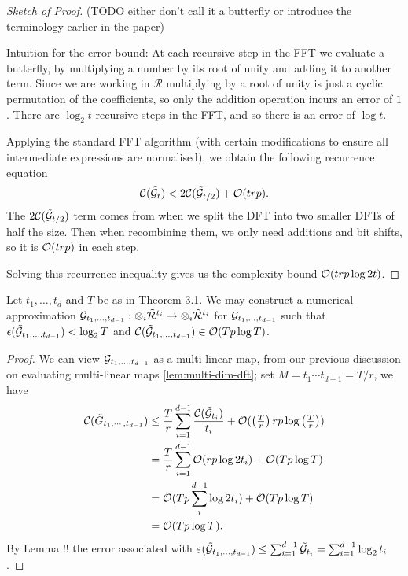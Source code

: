 \begin{proof}[Sketch of Proof]
    (TODO either don't call it a butterfly or introduce the terminology earlier in the paper)

    Intuition for the error bound: At each recursive step in the FFT we evaluate a butterfly, by multiplying a number by its root of unity and adding it to another term. Since we are working in $\mathscr{R}$ multiplying by a root of unity is just a cyclic permutation of the coefficients, so only the addition operation incurs an error of $1$. There are $\log_2 t$ recursive steps in the FFT, and so there is an error of $\log t$.

    \medskip

    Applying the standard FFT algorithm (with certain modifications to ensure all intermediate expressions are normalised), we obtain the following recurrence equation
    \[
        \mathcal C(\tilde{\mathcal G}_t) < 2 \mathcal C(\tilde{\mathcal G}_{t/2}) + \mathcal O(trp).
    \]
    The $2 \mathcal C(\tilde{\mathcal G}_{t/2})$ term comes from when we split the DFT into two smaller DFTs of half the size. Then when recombining them, we only need additions and bit shifts, so it is $\mathcal O(trp)$ in each step.

    Solving this recurrence inequality gives us the complexity bound $\mathcal O(trp \log 2 t)$.
\end{proof}

\begin{proposition}
    Let $t_1, \ldots, t_d$ and $T$ be as in Theorem 3.1. We may construct a numerical approximation $\mathcal G_{t_1, \ldots, t_{d-1}}: \otimes_i \tilde{\mathcal R}^{t_i} \to \otimes_i \tilde{\mathcal R}^{t_i}$ for $\mathcal G_{t_1, \ldots, t_{d-1}}$ such that $\epsilon(\tilde{\mathcal G}_{t_1, \ldots, t_{d-1}}) < \log_2 T$ and $\mathcal C(\tilde{\mathcal G}_{t_1, \ldots, t_{d-1}}) \in \mathcal O(Tp \log T)$.
\end{proposition}

\begin{proof}
    We can view $\mathcal G_{t_1, \ldots, t_{d-1}}$ as a multi-linear map, from our previous discussion on evaluating multi-linear maps \eqref{lem:multi-dim-dft}; set $M = t_1\cdots t_{d-1} = T/r$, we have
    \begin{align*}
        \mathcal C(\tilde{G}_{t_1, \cdots, t_{d-1}}) &\leq \frac{T}{r} \sum^{d-1}_{i=1} \frac{\mathcal C(\tilde{\mathcal G}_{t_i})}{t_i} + \mathcal O(\left(\tfrac{T}{r}\right)rp\log \left(\tfrac{T}{r}\right))\\
                                                &= \frac{T}{r}\sum^{d-1}_{i=1}\mathcal O(rp\log 2t_i) + \mathcal O(Tp \log T)\\
                                                &= \mathcal O(Tp \sum_i^{d-1}\log 2t_i) + \mathcal O(Tp \log T)\\
                                                &= \mathcal O(Tp \log T).
    \end{align*}
    By Lemma !!  the error associated with $\varepsilon(\tilde{\mathcal G}_{t_1, \ldots, t_{d-1}}) \le \sum_{i=1}^{d-1}\tilde{\mathcal G}_{t_i} = \sum_{i=1}^{d-1} \log_2 t_i$.
\end{proof}

